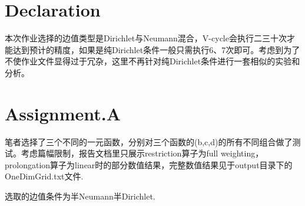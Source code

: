 \documentclass[a4paper,11.5pt,UTF8]{ctexart}
\begin{document}
\begin{large}
	
\section{Declaration}
\par 本次作业选择的边值类型是Dirichlet与Neumann混合，V-cycle会执行二三十次才能达到预计的精度，如果是纯Dirichlet条件一般只需执行6、7次即可。考虑到为了不使作业文件显得过于冗杂，这里不再针对纯Dirichlet条件进行一套相似的实验和分析。
	
\section{Assignment.A}
\par 笔者选择了三个不同的一元函数，分别对三个函数的(b,c,d)的所有不同组合做了测试。考虑篇幅限制，报告文档里只展示restriction算子为full weighting，prolongation算子为linear时的部分数值结果，完整数值结果见于output目录下的OneDimGrid.txt文件.
\par 选取的边值条件为半Neumann半Dirichlet.

\end{large}
\end{document}
